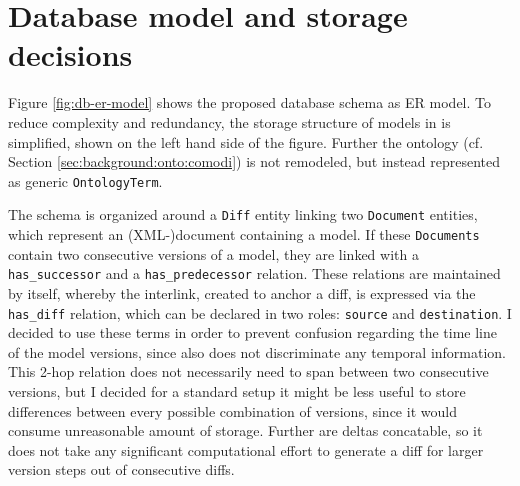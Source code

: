 \section{Database model and storage decisions}
\label{sec:concept:dbmodel}

Figure \ref{fig:db-er-model} shows the proposed database schema as ER model. To reduce complexity and redundancy, the storage structure of models in \masymos is simplified, shown on the left hand side of the figure. Further the \comodi ontology (cf. Section \ref{sec:background:onto:comodi}) is not remodeled, but instead represented as generic \texttt{OntologyTerm}.


The schema is organized around a \texttt{Diff} entity linking two \texttt{Document} entities, which represent an (XML-)document containing a model. If these \texttt{Documents} contain two consecutive versions of a model, they are linked with a \texttt{has\_successor} and a \texttt{has\_predecessor} relation. These relations are maintained by \masymos itself, whereby the interlink, created to anchor a diff, is expressed via the \texttt{has\_diff} relation, which can be declared in two roles: \texttt{source} and \texttt{destination}. I decided to use these terms in order to prevent confusion regarding the time line of the model versions, since \bives also does not discriminate any temporal information.
This 2-hop relation does not necessarily need to span between two consecutive versions, but I decided for a standard setup it might be less useful to store differences between every possible combination of versions, since it would consume unreasonable amount of storage. Further are deltas concatable, so it does not take any significant computational effort to generate a diff for larger version steps out of consecutive diffs.

